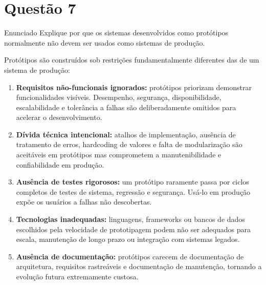 \documentclass[12pt,a4paper]{article}
\begin{document}
\begin{resposta}
\end{resposta}

\section*{Questão 7}

\begin{questao}{Enunciado}
Explique por que os sistemas desenvolvidos como protótipos normalmente não
devem ser usados como sistemas de produção.
\end{questao}

\begin{resposta}

Protótipos são construídos sob restrições fundamentalmente diferentes das de um
sistema de produção:

\begin{enumerate}
  \item \textbf{Requisitos não-funcionais ignorados:} protótipos priorizam
        demonstrar funcionalidades visíveis. Desempenho, segurança, disponibilidade,
        escalabilidade e tolerância a falhas são deliberadamente omitidos para
        acelerar o desenvolvimento.

  \item \textbf{Dívida técnica intencional:} atalhos de implementação, ausência de
        tratamento de erros, hardcoding de valores e falta de modularização são
        aceitáveis em protótipos mas comprometem a manutenibilidade e confiabilidade
        em produção.

  \item \textbf{Ausência de testes rigorosos:} um protótipo raramente passa por
        ciclos completos de testes de sistema, regressão e segurança. Usá-lo
        em produção expõe os usuários a falhas não descobertas.

  \item \textbf{Tecnologias inadequadas:} linguagens, frameworks ou bancos de
        dados escolhidos pela velocidade de prototipagem podem não ser adequados
        para escala, manutenção de longo prazo ou integração com sistemas legados.

  \item \textbf{Ausência de documentação:} protótipos carecem de documentação de
        arquitetura, requisitos rastreáveis e documentação de manutenção,
        tornando a evolução futura extremamente custosa.


\end{enumerate}
\end{resposta}
\end{document}
